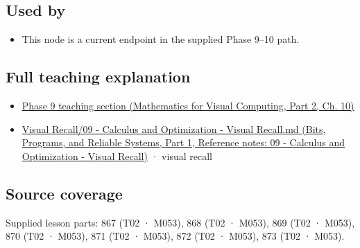 \subsection{Used by}\label{appendix-54c8f5828387-used-by}

\hypertarget{appendix-54c8f5828387-used-by}{}

\begin{itemize}
\tightlist
\item
  This node is a current endpoint in the supplied Phase 9--10 path.
\end{itemize}

\subsection{Full teaching explanation}\label{appendix-54c8f5828387-full-teaching-explanation}

\hypertarget{appendix-54c8f5828387-full-teaching-explanation}{}

\begin{itemize}
\tightlist
\item
  \href{../02-Mathematics-for-Visual-Computing-P02/main.pdf\#02-foundations-ii-ch026-optimization-and-inverse-problems}{Phase 9 teaching section (Mathematics for Visual Computing, Part 2, Ch. 10)}
\item
  \href{../01-Bits-Programs-and-Reliable-Systems-P01/main.pdf\#appendix-adf48f5dc5c1}{Visual Recall/09 - Calculus and Optimization - Visual Recall.md (Bits, Programs, and Reliable Systems, Part 1, Reference notes: 09 - Calculus and Optimization - Visual Recall)} · visual recall
\end{itemize}

\subsection{Source coverage}\label{appendix-54c8f5828387-source-coverage}

\hypertarget{appendix-54c8f5828387-source-coverage}{}

Supplied lesson parts: 867 (T02 · M053), 868 (T02 · M053), 869 (T02 · M053), 870 (T02 · M053), 871 (T02 · M053), 872 (T02 · M053), 873 (T02 · M053).
